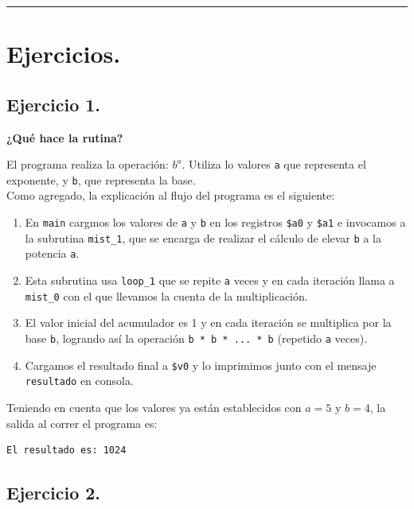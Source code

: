 \documentclass[12pt,letterpaper]{article}
\begin{document}
\bigskip
\hrule height 0.1pt
\bigskip

\section*{Ejercicios.}

\subsection*{Ejercicio 1.}

\textbf{¿Qué hace la rutina?}

El programa realiza la operación: $b^a$. Utiliza lo valores \texttt{a} que representa el exponente, y \texttt{b}, que representa la base.\\

Como agregado, la explicaci\'{o}n al flujo del programa es el siguiente:

\begin{enumerate}
\item En \texttt{main} cargmos los valores de \texttt{a} y \texttt{b} en los registros \texttt{\$a0} y \texttt{\$a1} e invocamos a la subrutina \texttt{mist\_1}, que se encarga de realizar el cálculo de elevar \texttt{b} a la potencia \texttt{a}.
\item Esta subrutina usa \texttt{loop\_1} que se repite \texttt{a} veces y en cada iteración llama a \texttt{mist\_0} con el que llevamos la cuenta de la multiplicación.
\item El valor inicial del acumulador es 1 y en cada iteración se multiplica por la base \texttt{b}, logrando así la operación \texttt{b * b * ... * b} (repetido \texttt{a} veces).
\item Cargamos el resultado final a \texttt{\$v0} y lo imprimimos junto con el mensaje \texttt{resultado} en consola.
\end{enumerate}

Teniendo en cuenta que los valores ya est\'{a}n establecidos con $a = 5$ y $b = 4$, la salida al correr el programa es:

\begin{verbatim}
El resultado es: 1024
\end{verbatim}

\newpage

\subsection*{Ejercicio 2.}
\end{document}
